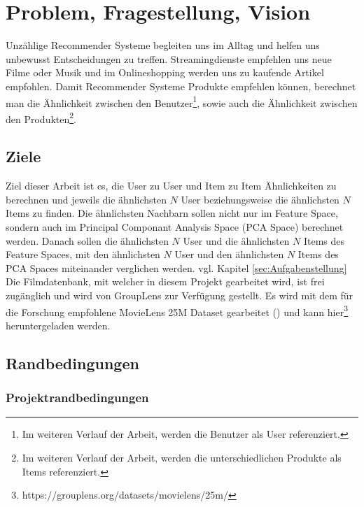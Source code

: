 \chapter{Problem, Fragestellung, Vision}
\label{ch:ProblemFragestellungVision}
Unzählige Recommender Systeme begleiten uns im Alltag und helfen uns unbewusst Entscheidungen zu treffen. Streamingdienste empfehlen uns neue Filme oder Musik und im Onlineshopping werden uns zu kaufende Artikel empfohlen. Damit Recommender Systeme Produkte empfehlen können, berechnet man die Ähnlichkeit zwischen den Benutzer\footnote{Im weiteren Verlauf der Arbeit, werden die Benutzer als User referenziert.}, sowie auch die Ähnlichkeit zwischen den Produkten\footnote{Im weiteren Verlauf der Arbeit, werden die unterschiedlichen Produkte als Items referenziert.}.\\

\section{Ziele}
\noindent Ziel dieser Arbeit ist es, die User zu User und Item zu Item Ähnlichkeiten zu berechnen und jeweils die ähnlichsten $N$ User beziehungsweise die ähnlichsten $N$ Items zu finden.
Die ähnlichsten Nachbarn sollen nicht nur im Feature Space, sondern auch im Principal Componant Analysis Space (PCA Space) berechnet werden. Danach sollen die ähnlichsten $N$ User und die ähnlichsten $N$ Items des Feature Spaces, mit den ähnlichsten $N$ User und den ähnlichsten $N$ Items des PCA Spaces miteinander verglichen werden. vgl.  Kapitel \ref{sec:Aufgabenstellung} \\

\noindent Die Filmdatenbank, mit welcher in diesem Projekt gearbeitet wird, ist frei zugänglich und wird von GroupLens zur Verfügung gestellt. Es wird mit dem für die Forschung empfohlene MovieLens 25M Dataset gearbeitet (\cite{10.1145/2827872}) und kann hier\footnote{https://grouplens.org/datasets/movielens/25m/} heruntergeladen werden.

\section{Randbedingungen}
\subsection{Projektrandbedingungen}

